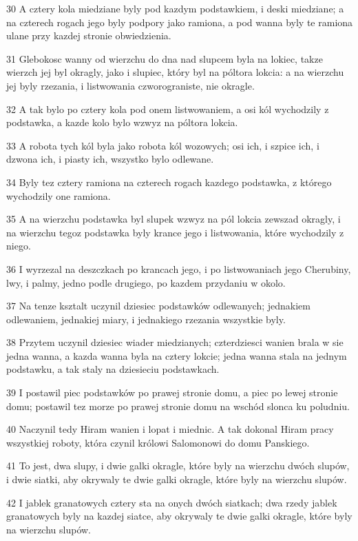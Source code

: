 \par 30 A cztery kola miedziane byly pod kazdym podstawkiem, i deski miedziane; a na czterech rogach jego byly podpory jako ramiona, a pod wanna byly te ramiona ulane przy kazdej stronie obwiedzienia.
\par 31 Glebokosc wanny od wierzchu do dna nad slupcem byla na lokiec, takze wierzch jej byl okragly, jako i slupiec, który byl na póltora lokcia: a na wierzchu jej byly rzezania, i listwowania czworograniste, nie okragle.
\par 32 A tak bylo po cztery kola pod onem listwowaniem, a osi kól wychodzily z podstawka, a kazde kolo bylo wzwyz na póltora lokcia.
\par 33 A robota tych kól byla jako robota kól wozowych; osi ich, i szpice ich, i dzwona ich, i piasty ich, wszystko bylo odlewane.
\par 34 Byly tez cztery ramiona na czterech rogach kazdego podstawka, z którego wychodzily one ramiona.
\par 35 A na wierzchu podstawka byl slupek wzwyz na pól lokcia zewszad okragly, i na wierzchu tegoz podstawka byly krance jego i listwowania, które wychodzily z niego.
\par 36 I wyrzezal na deszczkach po krancach jego, i po listwowaniach jego Cherubiny, lwy, i palmy, jedno podle drugiego, po kazdem przydaniu w okolo.
\par 37 Na tenze ksztalt uczynil dziesiec podstawków odlewanych; jednakiem odlewaniem, jednakiej miary, i jednakiego rzezania wszystkie byly.
\par 38 Przytem uczynil dziesiec wiader miedzianych; czterdziesci wanien brala w sie jedna wanna, a kazda wanna byla na cztery lokcie; jedna wanna stala na jednym podstawku, a tak staly na dziesieciu podstawkach.
\par 39 I postawil piec podstawków po prawej stronie domu, a piec po lewej stronie domu; postawil tez morze po prawej stronie domu na wschód slonca ku poludniu.
\par 40 Naczynil tedy Hiram wanien i lopat i miednic. A tak dokonal Hiram pracy wszystkiej roboty, która czynil królowi Salomonowi do domu Panskiego.
\par 41 To jest, dwa slupy, i dwie galki okragle, które byly na wierzchu dwóch slupów, i dwie siatki, aby okrywaly te dwie galki okragle, które byly na wierzchu slupów.
\par 42 I jablek granatowych cztery sta na onych dwóch siatkach; dwa rzedy jablek granatowych byly na kazdej siatce, aby okrywaly te dwie galki okragle, które byly na wierzchu slupów.
